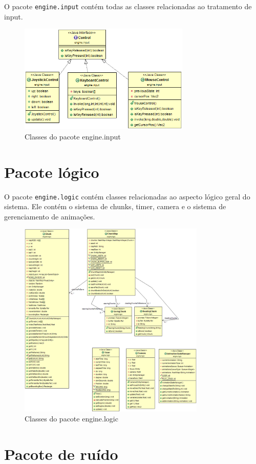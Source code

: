 \documentclass[12pt, 
openright, 
oneside, 
a4paper,    
brazil]{facom-ufu-abntex2}
\begin{document}
O pacote \texttt{engine.input} contém todas as classes relacionadas ao tratamento de input.

\begin{figure}[H]
	\centering
	\includegraphics[width=22em]{imagens/engine.input.png}
	\caption{Classes do pacote engine.input}
\end{figure}


\section{Pacote lógico}

O pacote \texttt{engine.logic} contém classes relacionadas ao aspecto lógico geral do sistema. Ele contém o sistema de chunks, timer, camera e o sistema de gerenciamento de animações.

\begin{figure}[H]
	\centering
	\includegraphics[width=24em]{imagens/engine.logic.png}
	\caption{Classes do pacote engine.logic}
\end{figure}

\section{Pacote de ruído}
\end{document}
